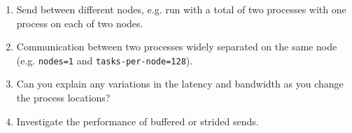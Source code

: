 \documentclass{article}
\begin{document}
\begin{enumerate}

\item Send between different nodes, e.g. run with a total of two
  processes with one process on each of two nodes.

\item Communication between two processes widely separated on the same
  node (e.g.  \verb+nodes=1+ and \verb+tasks-per-node=128+).

\item Can you explain any variations in the latency and bandwidth
  as you change the process locations?

\item Investigate the performance of buffered or strided sends.

\end{enumerate}
\end{document}

